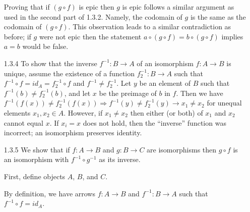 \documentclass{article}
\begin{document}
\begin{enumerate}
  Proving that if $(g \circ f)$ is epic then $g$ is epic follows a similar argument as used in the second part of 1.3.2.
  Namely, the codomain of $g$ is the same as the codomain of $(g \circ f)$.
  This observation leads to a similar contradiction as before; if $g$ were not epic then the statement $a \circ (g \circ f) = b \circ (g \circ f)$ implies $a = b$ would be false.

\item[]
\item[1.3.4]
  To show that the inverse $f^{-1} : B \rightarrow A$ of an isomorphism $f : A\rightarrow B$ is unique, assume the existence of a function $f^{-1}_2 : B \rightarrow A$ such that $f^{-1} \circ f = id_A = f^{-1}_2 \circ f$ and $f^{-1} \ne f^{-1}_2$.
  Let $y$ be an element of $B$ such that $f^{-1}(b) \ne f^{-1}_2(b)$, and let $x$ be the preimage of $b$ in $f$.
  Then we have $f^{-1}(f(x)) \ne f^{-1}_2(f(x)) \Rightarrow f^{-1}(y) \ne f^{-1}_2(y) \rightarrow x_1 \ne x_2$ for unequal elements $x_1,x_2 \in A$.
  However, if $x_1 \ne x_2$ then either (or both) of $x_1$ and $x_2$ cannot equal $x$.
  If $x_i = x$ does not hold, then the ``inverse'' function was incorrect; an isomorphism preserves identity.

\item[]
\item[1.3.5]
  We show that if $f : A \rightarrow B$ and $g : B \rightarrow C$ are isomorphisms then $g \circ f$ is an isomorphism with $f^{-1} \circ g^{-1}$ as its inverse.

  First, define objects $A$, $B$, and $C$.
  \begin{center}
  \end{center}

  By definition, we have arrows $f : A \rightarrow B$ and $f^{-1} : B \rightarrow A$ such that $f^{-1} \circ f = id_A$.
  \begin{center}
  \end{center}


\end{enumerate}
\end{document}
